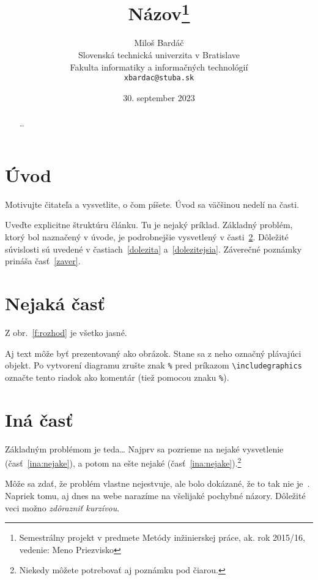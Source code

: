 \documentclass[10pt,twoside,slovak,coursepaper]{article}
\title{Názov\thanks{Semestrálny projekt v predmete Metódy inžinierskej 
práce, ak. rok 2015/16, vedenie: Meno Priezvisko}} %
\author{Miloš Bardáč\\[2pt]
	{\small Slovenská technická univerzita v Bratislave}\\
	{\small Fakulta informatiky a informačných technológií}\\
	{\small \texttt{xbardac@stuba.sk}}
	}
\date{\small 30. september 2023} %
\begin{document}
\maketitle

\begin{abstract}
\ldots
\end{abstract}



\section{Úvod}

Motivujte čitateľa a vysvetlite, o čom píšete. Úvod sa väčšinou nedelí na 
časti.

Uveďte explicitne štruktúru článku. Tu je nejaký príklad.
Základný problém, ktorý bol naznačený v úvode, je podrobnejšie vysvetlený 
v časti~\ref{nejaka}.
Dôležité súvislosti sú uvedené v častiach~\ref{dolezita} 
a~\ref{dolezitejsia}.
Záverečné poznámky prináša časť~\ref{zaver}.



\section{Nejaká časť} \label{nejaka}

Z obr.~\ref{f:rozhod} je všetko jasné. 

\begin{figure*}[tbh]
\centering
Aj text môže byť prezentovaný ako obrázok. Stane sa z neho označný 
plávajúci objekt. Po vytvorení diagramu zrušte znak \texttt{\%} pred 
príkazom \verb|\includegraphics| označte tento riadok ako komentár (tiež 
pomocou znaku \texttt{\%}).
\caption{Rozhodujúci argument.}
\label{f:rozhod}
\end{figure*}



\section{Iná časť} \label{ina}

Základným problémom je teda\ldots{} Najprv sa pozrieme na nejaké 
vysvetlenie (časť~\ref{ina:nejake}), a potom na ešte nejaké 
(časť~\ref{ina:nejake}).\footnote{Niekedy môžete potrebovať aj poznámku 
pod čiarou.}

Môže sa zdať, že problém vlastne nejestvuje\cite{Coplien:MPD}, ale bolo 
dokázané, že to tak nie je~\cite{Czarnecki:Staged, Czarnecki:Progress}. 
Napriek tomu, aj dnes na webe narazíme na všelijaké pochybné 
názory\cite{PLP-Framework}. Dôležité veci možno \emph{zdôrazniť kurzívou}.
\end{document}
